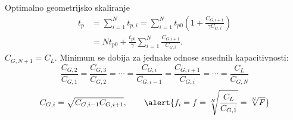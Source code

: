\begin{frame}[label=09_3-s018]{Optimalno geometrijsko skaliranje}
\[\begin{aligned}
t_p&=\sum_{i=1}^N t_{p,i}
=\sum_{i=1}^N t_{p0}\left(1+\frac{C_{G,i+1}}{\gamma C_{G,i}}\right)\\
&=Nt_{p0}+\frac{t_{p0}}\gamma\sum_{i=1}^N\frac{C_{G,i+1}}{C_{G,i}}.
\end{aligned}\]
$C_{G,N+1}=C_L$. Minimum se dobija za jednake odnose susednih kapacitivnosti:
\[\frac{C_{G,2}}{C_{G,1}}=\frac{C_{G,3}}{C_{G,2}}=\cdots
=\frac{C_{G,i}}{C_{G,i-1}}=\frac{C_{G,i+1}}{C_{G,i}}=\cdots=\frac{C_L}{C_{G,N}}\]
\[C_{G,i}=\sqrt{C_{G,i-1}C_{G,i+1}},\qquad
\alert{f_i=f=\sqrt[N]{\frac{C_L}{C_{G,1}}}=\sqrt[N]F}\]
\end{frame}
